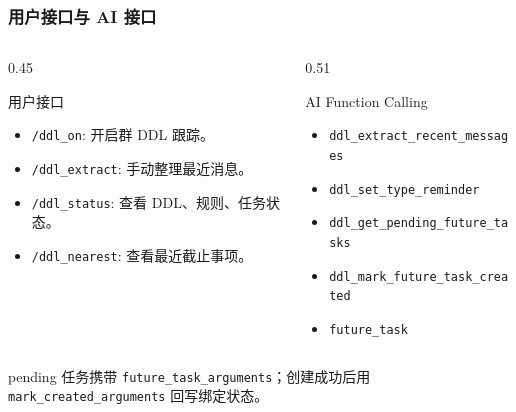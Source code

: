 \begin{frame}
  \frametitle{用户接口与 AI 接口}
  \small
  \begin{columns}[T]
    \begin{column}{0.45\textwidth}
      \begin{block}{用户接口}
        \begin{itemize}\setlength{\itemsep}{1pt}
          \item \texttt{/ddl\_on}: 开启群 DDL 跟踪。
          \item \texttt{/ddl\_extract}: 手动整理最近消息。
          \item \texttt{/ddl\_status}: 查看 DDL、规则、任务状态。
          \item \texttt{/ddl\_nearest}: 查看最近截止事项。
        \end{itemize}
      \end{block}
    \end{column}
    \begin{column}{0.51\textwidth}
      \begin{block}{AI Function Calling}
        \begin{itemize}\setlength{\itemsep}{1pt}
          \item \texttt{ddl\_extract\_recent\_messages}
          \item \texttt{ddl\_set\_type\_reminder}
          \item \texttt{ddl\_get\_pending\_future\_tasks}
          \item \texttt{ddl\_mark\_future\_task\_created}
          \item \texttt{future\_task}
        \end{itemize}
      \end{block}
    \end{column}
  \end{columns}
  \vspace{0.05cm}
  \begin{noteBlock}
    \scriptsize pending 任务携带 \texttt{future\_task\_arguments}；创建成功后用 \texttt{mark\_created\_arguments} 回写绑定状态。
  \end{noteBlock}
\end{frame}

